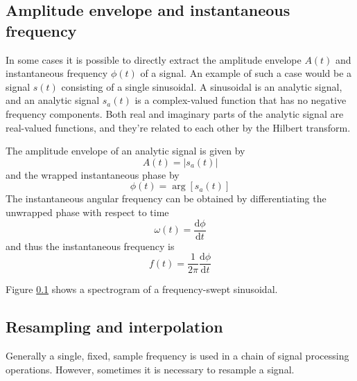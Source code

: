 \subsection{Amplitude envelope and instantaneous frequency}
In some cases it is possible to directly extract the amplitude envelope $A(t)$
and instantaneous frequency $\phi(t)$ of a signal. An example of such a case
would be a signal $s(t)$ consisting of a single sinusoidal. A sinusoidal is an
analytic signal, and an analytic signal $s_a(t)$ is a complex-valued function
that has no negative frequency components. Both real and imaginary parts of the
analytic signal are real-valued functions, and they're related to each other by
the Hilbert transform.

The amplitude envelope of an analytic signal is given by
\begin{equation}
 A(t) = |s_a(t)|
\end{equation}
and the wrapped instantaneous phase by
\begin{equation}
 \phi(t) = \arg{\left[s_a(t) \right]}
\end{equation}
The instantaneous angular frequency can be obtained by differentiating the unwrapped phase with respect to time
\begin{equation}
 \omega (t) = \frac{\mathrm{d}\phi}{\mathrm{d}t}
\end{equation}
and thus the instantaneous frequency is
\begin{equation}
 f (t) = \frac{1}{2\pi} \frac{\mathrm{d}\phi}{\mathrm{d}t}
\end{equation}

Figure \ref{} shows a spectrogram of a frequency-swept sinusoidal.



\newpage
\subsection{Resampling and interpolation}\label{sec:theory:signal:resampling}
Generally a single, fixed, sample frequency is used in a chain of signal
processing operations. However, sometimes it is necessary to resample a signal.

